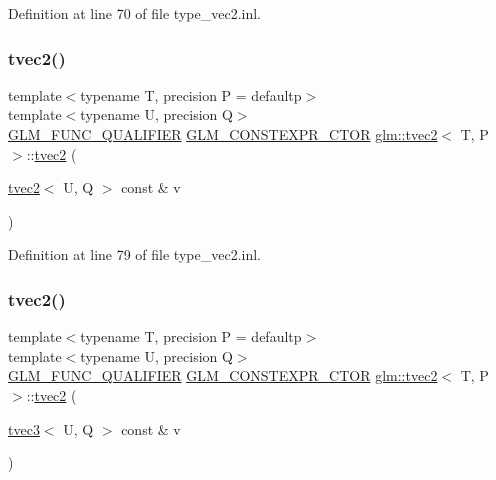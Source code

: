 Definition at line 70 of file type\+\_\+vec2.\+inl.

\mbox{\label{structglm_1_1tvec2_aa86f005e11de8a9134370f9d92fb096c}} 
\subsubsection{\texorpdfstring{tvec2()}{tvec2()}\hspace{0.1cm}{\footnotesize\ttfamily [15/17]}}
{\footnotesize\ttfamily template$<$typename T, precision P = defaultp$>$ \\
template$<$typename U, precision Q$>$ \\
\mbox{\hyperlink{setup_8hpp_a33fdea6f91c5f834105f7415e2a64407}{G\+L\+M\+\_\+\+F\+U\+N\+C\+\_\+\+Q\+U\+A\+L\+I\+F\+I\+ER}} \mbox{\hyperlink{setup_8hpp_ad34178a09666081abdb573c14d1f4a5a}{G\+L\+M\+\_\+\+C\+O\+N\+S\+T\+E\+X\+P\+R\+\_\+\+C\+T\+OR}} \mbox{\hyperlink{structglm_1_1tvec2}{glm\+::tvec2}}$<$ T, P $>$\+::\mbox{\hyperlink{structglm_1_1tvec2}{tvec2}} (\begin{DoxyParamCaption}\item[{\mbox{\hyperlink{structglm_1_1tvec2}{tvec2}}$<$ U, Q $>$ const \&}]{v }\end{DoxyParamCaption})}



Definition at line 79 of file type\+\_\+vec2.\+inl.

\mbox{\label{structglm_1_1tvec2_a3912fabf45f663470f74776ed1c32c15}} 
\subsubsection{\texorpdfstring{tvec2()}{tvec2()}\hspace{0.1cm}{\footnotesize\ttfamily [16/17]}}
{\footnotesize\ttfamily template$<$typename T, precision P = defaultp$>$ \\
template$<$typename U, precision Q$>$ \\
\mbox{\hyperlink{setup_8hpp_a33fdea6f91c5f834105f7415e2a64407}{G\+L\+M\+\_\+\+F\+U\+N\+C\+\_\+\+Q\+U\+A\+L\+I\+F\+I\+ER}} \mbox{\hyperlink{setup_8hpp_ad34178a09666081abdb573c14d1f4a5a}{G\+L\+M\+\_\+\+C\+O\+N\+S\+T\+E\+X\+P\+R\+\_\+\+C\+T\+OR}} \mbox{\hyperlink{structglm_1_1tvec2}{glm\+::tvec2}}$<$ T, P $>$\+::\mbox{\hyperlink{structglm_1_1tvec2}{tvec2}} (\begin{DoxyParamCaption}\item[{\mbox{\hyperlink{structglm_1_1tvec3}{tvec3}}$<$ U, Q $>$ const \&}]{v }\end{DoxyParamCaption})}



